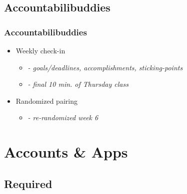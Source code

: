 \documentclass{beamer}
\begin{document}
\subsection{Accountabilibuddies}

\begin{frame}
  \frametitle{Accountabilibuddies}

  \begin{itemize}
    \item Weekly check-in
    \begin{itemize}
      \item[] \emph{- goals/deadlines, accomplishments, sticking-points}
      \item[] \emph{- final 10 min. of Thursday class}
    \end{itemize}
    \item Randomized pairing
    \begin{itemize}
      \item[] \emph{- re-randomized week 6}
    \end{itemize}
  \end{itemize}

\end{frame}


\section{Accounts \& Apps}




\subsection{Required}
\end{document}
